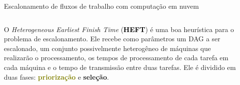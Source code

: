 \documentclass[final]{beamer}
\newcommand{\colorize}[2]{\textbf{\textcolor{#1}{#2}}}
\begin{document}
\begin{frame}[t]
\begin{columns}[t]
\begin{column}{0.35\paperwidth}

\end{column}

\begin{column}{0.60\paperwidth} 
	\begin{block}{Escalonamento de fluxos de trabalho com computação em nuvem}
		\begin{columns}[totalwidth=0.60\paperwidth]
		\begin{column}{0.33\paperwidth}
			O \emph{Heterogeneous Earliest Finish Time} (\colorize{black}{HEFT})
			\cite{topcoglu:heft} é uma boa heurística para o
			problema de escalonamento. Ele recebe como parâmetros um DAG a ser
			escalonado, um conjunto possivelmente heterogêneo de máquinas que
			realizarão o processamento, os tempos de processamento de cada tarefa
			em cada máquina e o tempo de transmissão entre duas tarefas. Ele
			é dividido em duas fases: \colorize{olive}{priorização} e 
			\colorize{n_violet}{seleção}. 
	

\end{column}
\end{columns}
\end{block}
\end{column}
\end{columns}
\end{frame}
\end{document}
